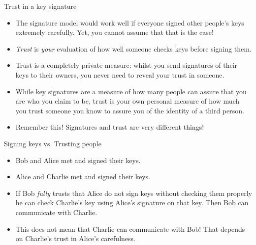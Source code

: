 \documentclass[hyperref={colorlinks=true}]{beamer}
\begin{document}
\begin{frame}{Trust in a key signature}
  \begin{itemize}
    \item The signature model would work well if everyone signed other people's
keys extremely carefully.  Yet, you cannot assume that that is the case!
    \item \emph{Trust} is \emph{your} evaluation of how well someone checks
keys before signing them.
    \item Trust is a completely private measure: whilst you send signatures of
their keys to their owners, you never need to reveal your trust in someone.
    \item While key signatures are a measure of how many people can assure that
you are who you claim to be, trust is your own personal measure of how much you
trust someone you know to assure you of the identity of a third person.
    \item Remember this!  Signatures and trust are very different things!
  \end{itemize}
\end{frame}

\begin{frame}{Signing keys vs. Trusting people}
  \begin{itemize}
    \item Bob and Alice met and signed their keys.
    \item Alice and Charlie met and signed their keys.
    \item If Bob \emph{fully} trusts that Alice do not sign keys without
checking them properly he can check Charlie's key using Alice's signature on
that key.  Then Bob can communicate with Charlie.
    \item This does not mean that Charlie can communicate with Bob!  That
depends on Charlie's trust in Alice's carefulness.
  \end{itemize}
\end{frame}
\end{document}
